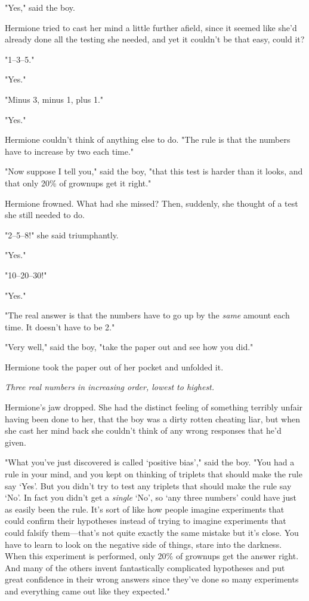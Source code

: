 "Yes," said the boy.

Hermione tried to cast her mind a little further afield, since it seemed like
she'd already done all the testing she needed, and yet it couldn't be that
easy, could it?

"1--3--5."

"Yes."

"Minus 3, minus 1, plus 1."

"Yes."

Hermione couldn't think of anything else to do. "The rule is that the numbers
have to increase by two each time."

"Now suppose I tell you," said the boy, "that this test is harder than it
looks, and that only 20\% of grownups get it right."

Hermione frowned. What had she missed? Then, suddenly, she thought of a test
she still needed to do.

"2--5--8!" she said triumphantly.

"Yes."

"10--20--30!"

"Yes."

"The real answer is that the numbers have to go up by the \emph{same} amount
each time. It doesn't have to be 2."

"Very well," said the boy, "take the paper out and see how you did."

Hermione took the paper out of her pocket and unfolded it.

\emph{Three real numbers in increasing order, lowest to highest.}

Hermione's jaw dropped. She had the distinct feeling of something terribly
unfair having been done to her, that the boy was a dirty rotten cheating liar,
but when she cast her mind back she couldn't think of any wrong responses that
he'd given.

"What you've just discovered is called `positive bias'," said the boy. "You had
a rule in your mind, and you kept on thinking of triplets that should make the
rule say `Yes'. But you didn't try to test any triplets that should make the
rule say `No'. In fact you didn't get a \emph{single} `No', so `any three
numbers' could have just as easily been the rule. It's sort of like how people
imagine experiments that could confirm their hypotheses instead of trying to
imagine experiments that could falsify them---that's not quite exactly the same
mistake but it's close. You have to learn to look on the negative side of
things, stare into the darkness. When this experiment is performed, only 20\% of
grownups get the answer right. And many of the others invent fantastically
complicated hypotheses and put great confidence in their wrong answers since
they've done so many experiments and everything came out like they expected."

